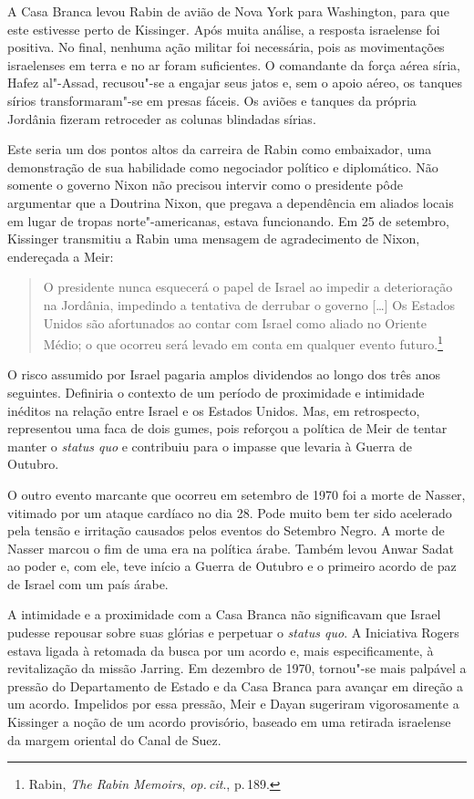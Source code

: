 A Casa Branca levou Rabin de avião de Nova York para Washington, para
que este estivesse perto de Kissinger. Após muita análise, a resposta
israelense foi positiva. No final, nenhuma ação militar foi necessária,
pois as movimentações israelenses em terra e no ar foram suficientes. O
comandante da força aérea síria, Hafez al"-Assad, recusou"-se a engajar
seus jatos e, sem o apoio aéreo, os tanques sírios transformaram"-se em
presas fáceis. Os aviões e tanques da própria Jordânia fizeram
retroceder as colunas blindadas sírias.

Este seria um dos pontos altos da carreira de Rabin como embaixador, uma
demonstração de sua habilidade como negociador político e diplomático.
Não somente o governo Nixon não precisou intervir como o presidente pôde
argumentar que a Doutrina Nixon, que pregava a dependência em aliados
locais em lugar de tropas norte"-americanas, estava funcionando. Em 25 de
setembro, Kissinger transmitiu a Rabin uma mensagem de agradecimento de
Nixon, endereçada a Meir:

\begin{quote}
O presidente nunca esquecerá o papel de Israel ao impedir a
deterioração na Jordânia, impedindo a tentativa de derrubar o governo {[}\ldots{}{]}
Os Estados Unidos são afortunados ao contar com Israel como aliado no
Oriente Médio; o que ocorreu será levado em conta em qualquer evento
futuro.\footnote{Rabin, \textit{The Rabin Memoirs}, \textit{op.\,cit}., p.\,189.}
\end{quote}

O risco assumido por Israel pagaria amplos dividendos ao longo dos três
anos seguintes. Definiria o contexto de um período de proximidade e
intimidade inéditos na relação entre Israel e os Estados Unidos. Mas, em
retrospecto, representou uma faca de dois gumes, pois reforçou a
política de Meir de tentar manter o \textit{status quo} e contribuiu para
o impasse que levaria à Guerra de Outubro.

O outro evento marcante que ocorreu em setembro de 1970 foi a morte de
Nasser, vitimado por um ataque cardíaco no dia 28. Pode muito bem ter
sido acelerado pela tensão e irritação causados pelos eventos do
Setembro Negro. A morte de Nasser marcou o fim de uma era na política
árabe. Também levou Anwar Sadat ao poder e, com ele, teve início a Guerra de Outubro e
o primeiro acordo de paz de Israel com um país árabe.

A intimidade e a proximidade com a Casa Branca não significavam que
Israel pudesse repousar sobre suas glórias e perpetuar o \textit{status
quo}. A Iniciativa Rogers estava ligada à retomada da busca por um
acordo e, mais especificamente, à revitalização da missão Jarring. Em
dezembro de 1970, tornou"-se mais palpável a pressão do Departamento de
Estado e da Casa Branca para avançar em direção a um acordo. Impelidos
por essa pressão, Meir e Dayan sugeriram vigorosamente a Kissinger a
noção de um acordo provisório, baseado em uma retirada israelense da
margem oriental do Canal de Suez.

